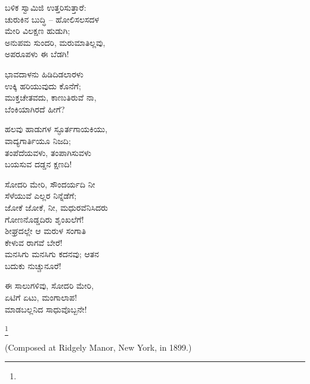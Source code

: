 \begin{myquote}
ಬಳಿಕ ಸ್ವಾಮಿಜಿ ಉತ್ತರಿಸುತ್ತಾರೆ:\\ಚುರುಕಿನ ಬುದ್ಧಿ – ಹೋಲಿಸಲಸದಳ\\ಮೇರಿ ವಿಲಕ್ಷಣ ಹುಡುಗಿ;\\ಅನುಪಮ ಸುಂದರಿ, ಮರುಮಾತಿಲ್ಲವು,\\ಅಪರೂಪಳು ಈ ಬೆಡಗಿ!
\end{myquote}

\begin{myquote}
ಭಾವದಾಳನು ಹಿಡಿದಿಡಲಾರಳು\\ಉಕ್ಕಿ ಹರಿಯುವುದು ಕೊನೆಗೆ;\\ಮುಕ್ತಚೇತವದು, ಕಾಣುತಿರುವೆ ನಾ,\\ಬೆಂಕಿಯಾಗಿರದೆ ಹೀಗೆ?
\end{myquote}

\begin{myquote}
ಹಲವು ಹಾಡುಗಳ ಸ್ಫೂರ್ತಗಾಯಕಿಯು,\\ವಾದ್ಯಗಾರ್ತಿಯೂ ನಿಜದಿ;\\ತಂಪೆದೆಯವಳು, ತಂಪಾಗಿಸುವಳು\\ಬಯಸುವ ದಡ್ಡನ ಕ್ಷಣದಿ!
\end{myquote}

\begin{myquote}
ಸೋದರಿ ಮೇರಿ, ಸೌಂದರ್ಯದಿ ನೀ\\ಸೆಳೆಯುವೆ ಎಲ್ಲರ ನಿನ್ನೆಡೆಗೆ;\\ಜೋಕೆ ಜೋಕೆ, ನೀ, ಮಧುರವೆನಿಸಿದರು\\ಗೋಣನೊಡ್ಡದಿರು ಶೃಂಖಲೆಗೆ!\\ಶೀಘ್ರದಲ್ಲೇ ಆ ಮರುಳ ಸಂಗಾತಿ\\ಕೇಳುವ ರಾಗವೆ ಬೇರೆ!\\ಮನಸಿಗು ಮನಸಿಗು ಕದನವು; ಆತನ\\ಬದುಕು ನುಚ್ಚುನೂರೆ!
\end{myquote}

\begin{myquote}
ಈ ಸಾಲುಗಳಿವು, ಸೋದರಿ ಮೇರಿ,\\ಏಟಿಗೆ ಏಟು, ಮಂಗಾಲಾಪ!\\ಮಾಡಬಲ್ಲನಿದ ಸಾಧುವೊಬ್ಬನೇ!
\end{myquote}

\protect\footnote{}

\begin{center}
(Composed at Ridgely Manor, New York, in 1899.)
\end{center}

\begin{myquote}
\end{myquote}

